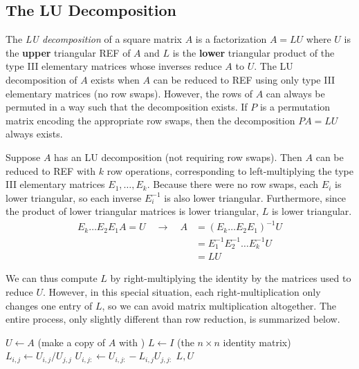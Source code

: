 \subsection*{The LU Decomposition} %

The \emph{LU decomposition} of a square matrix $A$ is a factorization $A=LU$ where $U$ is the \textbf{upper} triangular REF of $A$ and $L$ is the \textbf{lower} triangular product of the type III elementary matrices whose inverses reduce $A$ to $U$.
The LU decomposition of $A$ exists when $A$ can be reduced to REF using only type III elementary matrices (no row swaps).
However, the rows of $A$ can always be permuted in a way such that the decomposition exists.
If $P$ is a permutation matrix encoding the appropriate row swaps, then the decomposition $PA = LU$ always exists.

Suppose $A$ has an LU decomposition (not requiring row swaps).
Then $A$ can be reduced to REF with $k$ row operations, corresponding to left-multiplying the type III elementary matrices $E_1, \ldots, E_k$.
Because there were no row swaps, each $E_i$ is lower triangular, so each inverse $E_i^{-1}$ is also lower triangular.
Furthermore, since the product of lower triangular matrices is lower triangular, $L$ is lower triangular.
%
\begin{align*}
E_k\ldots E_2E_1 A = U\quad \longrightarrow\quad A &= (E_k \ldots E_2E_1)^{-1} U \\
&= E_1^{-1}E_2^{-1}\ldots E_k^{-1}U \\
&= LU
\end{align*}

We can thus compute $L$ by right-multiplying the identity by the matrices used to reduce $U$.
However, in this special situation, each right-multiplication only changes one entry of $L$, so we can avoid matrix multiplication altogether.
The entire process, only slightly different than row reduction, is summarized below. %
%
\begin{algorithm}[H]
\begin{algorithmic}[1]
\State $U \gets A$ (make a copy of $A$ with )
\State $L \gets I$ (the $n\times n$ identity matrix)
        \State $L_{i,j} \gets U_{i, j}/U_{j, j}$
        \State $U_{i,j:} \gets U_{i,j:} - L_{i,j}U_{j,j:}$
    \EndFor
\EndFor
\State {} $L, U$
\EndProcedure
\end{algorithmic}
\caption{}
\label{alg:LU-Decomposition}
\end{algorithm}

